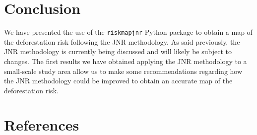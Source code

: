 \documentclass[paper=a4, 12pt, DIV=12]{scrartcl}
\begin{document}
\section{Conclusion}
\label{sec:orga9059fc}

We have presented the use of the \texttt{riskmapjnr} Python package to obtain a map of the deforestation risk following the JNR methodology. As said previously, the JNR methodology is currently being discussed and will likely be subject to changes. The first results we have obtained applying the JNR methodology to a small-scale study area allow us to make some recommendations regarding how the JNR methodology could be improved to obtain an accurate map of the deforestation risk.

\section{References}
\label{sec:org23ddb58}

\begin{hangparas}{1.5em}{1}

\end{hangparas}
\end{document}
